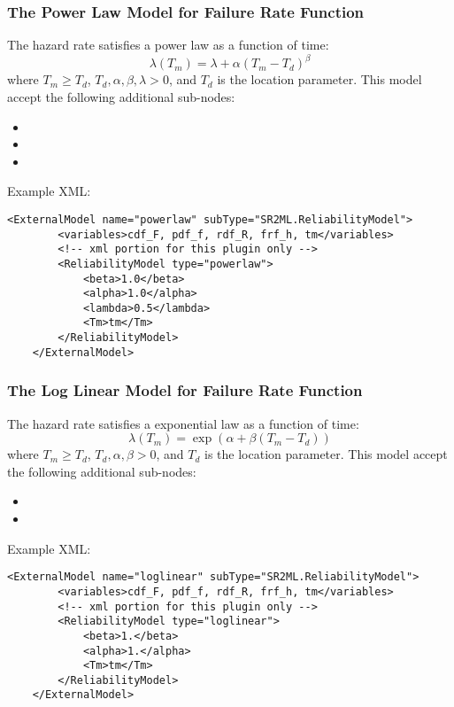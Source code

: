 \subsubsection{The Power Law Model for Failure Rate Function}
The hazard rate satisfies a power law as a function of time:
\begin{equation}
	\lambda(T_m) = \lambda + \alpha(T_m-T_d)^\beta
\end{equation}
where $T_m\geq T_d$, $T_d, \alpha, \beta, \lambda >0$,
and $T_d$ is the location parameter.
This model accept the following additional sub-nodes:
\begin{itemize}
	\item {}
	\item {}
	\item {}
\end{itemize}

Example XML:
\begin{lstlisting}[style=XML]
	<ExternalModel name="powerlaw" subType="SR2ML.ReliabilityModel">
		<variables>cdf_F, pdf_f, rdf_R, frf_h, tm</variables>
		<!-- xml portion for this plugin only -->
		<ReliabilityModel type="powerlaw">
			<beta>1.0</beta>
			<alpha>1.0</alpha>
			<lambda>0.5</lambda>
			<Tm>tm</Tm>
		</ReliabilityModel>
	</ExternalModel>
\end{lstlisting}


\subsubsection{The Log Linear Model for Failure Rate Function}
The hazard rate satisfies a exponential law as a function of time:
\begin{equation}
	\lambda(T_m) = \exp\left(\alpha+\beta(T_m-T_d)\right)
\end{equation}
where $T_m\geq T_d$, $T_d, \alpha, \beta >0$, and $T_d$ is the location parameter.
This model accept the following additional sub-nodes:
\begin{itemize}
	\item {}
	\item {}
\end{itemize}

Example XML:
\begin{lstlisting}[style=XML]
	<ExternalModel name="loglinear" subType="SR2ML.ReliabilityModel">
		<variables>cdf_F, pdf_f, rdf_R, frf_h, tm</variables>
		<!-- xml portion for this plugin only -->
		<ReliabilityModel type="loglinear">
			<beta>1.</beta>
			<alpha>1.</alpha>
			<Tm>tm</Tm>
		</ReliabilityModel>
	</ExternalModel>
\end{lstlisting}


